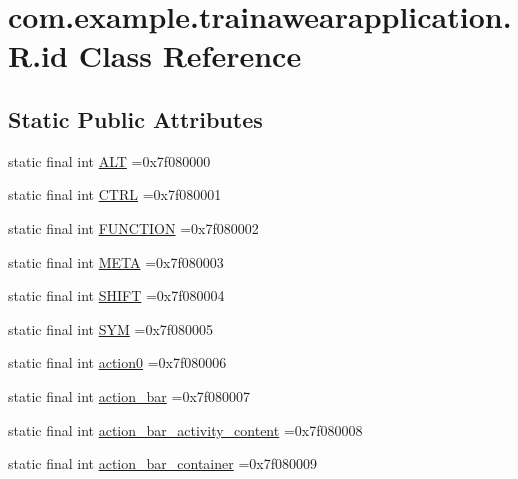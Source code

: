 \hypertarget{classcom_1_1example_1_1trainawearapplication_1_1_r_1_1id}{}\section{com.\+example.\+trainawearapplication.\+R.\+id Class Reference}
\label{classcom_1_1example_1_1trainawearapplication_1_1_r_1_1id}
\subsection*{Static Public Attributes}
\begin{DoxyCompactItemize}
\item 
static final int \mbox{\hyperlink{classcom_1_1example_1_1trainawearapplication_1_1_r_1_1id_aedcc2b67ea45310a9354b448ff3a1070}{A\+LT}} =0x7f080000
\item 
static final int \mbox{\hyperlink{classcom_1_1example_1_1trainawearapplication_1_1_r_1_1id_a4555eb276e0682f6c805dbfd09aa8215}{C\+T\+RL}} =0x7f080001
\item 
static final int \mbox{\hyperlink{classcom_1_1example_1_1trainawearapplication_1_1_r_1_1id_af55fac999f6d07d7374e1eb7dc6f9f88}{F\+U\+N\+C\+T\+I\+ON}} =0x7f080002
\item 
static final int \mbox{\hyperlink{classcom_1_1example_1_1trainawearapplication_1_1_r_1_1id_a40344700e81ce1250d67eb03772b472d}{M\+E\+TA}} =0x7f080003
\item 
static final int \mbox{\hyperlink{classcom_1_1example_1_1trainawearapplication_1_1_r_1_1id_a22964a043c6190d1a671b2d21a774da9}{S\+H\+I\+FT}} =0x7f080004
\item 
static final int \mbox{\hyperlink{classcom_1_1example_1_1trainawearapplication_1_1_r_1_1id_a234910d61e71d802f7f8735a83a36040}{S\+YM}} =0x7f080005
\item 
static final int \mbox{\hyperlink{classcom_1_1example_1_1trainawearapplication_1_1_r_1_1id_a6c80202eeccc7e6ceab24d9e82509bb9}{action0}} =0x7f080006
\item 
static final int \mbox{\hyperlink{classcom_1_1example_1_1trainawearapplication_1_1_r_1_1id_a192d9e0ded9da40d79991080c8ba46f9}{action\+\_\+bar}} =0x7f080007
\item 
static final int \mbox{\hyperlink{classcom_1_1example_1_1trainawearapplication_1_1_r_1_1id_a9092d931c8f129551f2ed780782cbbd6}{action\+\_\+bar\+\_\+activity\+\_\+content}} =0x7f080008
\item 
static final int \mbox{\hyperlink{classcom_1_1example_1_1trainawearapplication_1_1_r_1_1id_ac7c9b4779d95e9220103e1100e36cf70}{action\+\_\+bar\+\_\+container}} =0x7f080009

\end{DoxyCompactItemize}
